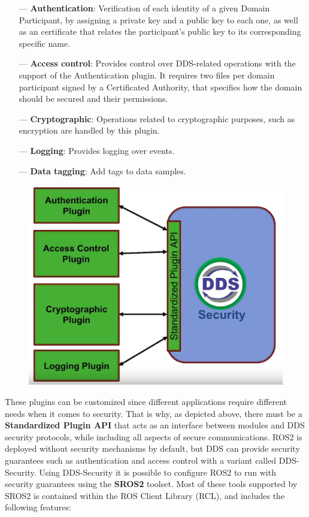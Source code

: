 \begin{itemize}
    \item[---] \textbf{Authentication}: Verification of each identity of a given Domain Participant, by assigning a private key and a public key to each one, as well as an certificate that relates the participant's public key to its corresponding specific name.
    \item[---] \textbf{Access control}: Provides control over DDS-related operations with the support of the Authentication plugin. It requires two files per domain participant signed by a Certificated Authority, that specifies how the domain should be secured and their permissions.
    \item[---] \textbf{Cryptographic}: Operations related to cryptographic purposes, such as encryption are handled by this plugin.
    \item[---] \textbf{Logging}: Provides logging over events.
    \item[---] \textbf{Data tagging}: Add tags to data samples.
\end{itemize}

\begin{figure}[H]
    \centering
    \includegraphics[width=0.5\linewidth]{images/dds-security.png}
\end{figure}
            
These plugins can be customized since different applications require different needs when it comes to security. That is why, as depicted above, there must be a \textbf{Standardized Plugin API} that acts as an interface between modules and DDS security protocols, while including all aspects of secure communications. 
ROS2 is deployed without security mechanisms by default, but DDS can provide security guarantees such as authentication and access control with a variant called DDS-Security. Using DDS-Security it is possible to configure ROS2 to run with security guarantees using the \textbf{SROS2} toolset. Most of these tools supported by SROS2 is contained within the ROS Client Library (RCL), and includes the following features:

